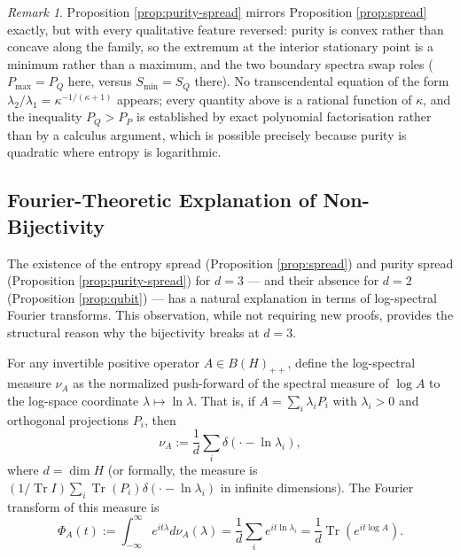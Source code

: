 \documentclass{article}
\theoremstyle{remark}
\newtheorem{remark}[theorem]{Remark}
\begin{document}
\begin{remark}
Proposition \ref{prop:purity-spread} mirrors Proposition \ref{prop:spread} exactly, but with every qualitative feature reversed: purity is convex rather than concave along the family, so the extremum at the interior stationary point is a minimum rather than a maximum, and the two boundary spectra swap roles ($P_{\max}=P_Q$ here, versus $S_{\min}=S_Q$ there). No transcendental equation of the form $\lambda_2/\lambda_1=\kappa^{-1/(\kappa+1)}$ appears; every quantity above is a rational function of $\kappa$, and the inequality $P_Q>P_P$ is established by exact polynomial factorisation rather than by a calculus argument, which is possible precisely because purity is quadratic where entropy is logarithmic.
\end{remark}

\subsection{Fourier-Theoretic Explanation of Non-Bijectivity}

The existence of the entropy spread (Proposition \ref{prop:spread}) and purity spread (Proposition \ref{prop:purity-spread}) for $d=3$ — and their absence for $d=2$ (Proposition \ref{prop:qubit}) — has a natural explanation in terms of log-spectral Fourier transforms. This observation, while not requiring new proofs, provides the structural reason why the bijectivity breaks at $d=3$.

For any invertible positive operator $A\in B(H)_{++}$, define the log-spectral measure $\nu_A$ as the normalized push-forward of the spectral measure of $\log A$ to the log-space coordinate $\lambda\mapsto\ln\lambda$. That is, if $A=\sum_i\lambda_i P_i$ with $\lambda_i>0$ and orthogonal projections $P_i$, then
\[
\nu_A := \frac1d\sum_i\delta(\cdot-\ln\lambda_i),
\]
where $d=\dim H$ (or formally, the measure is $(1/\operatorname{Tr}I)\sum_i\operatorname{Tr}(P_i)\delta(\cdot-\ln\lambda_i)$ in infinite dimensions). The Fourier transform of this measure is
\[
\Phi_A(t) := \int_{-\infty}^{\infty} e^{it\lambda}d\nu_A(\lambda) = \frac1d\sum_i e^{it\ln\lambda_i} = \frac1d\operatorname{Tr}(e^{it\log A}).
\]
\end{document}
